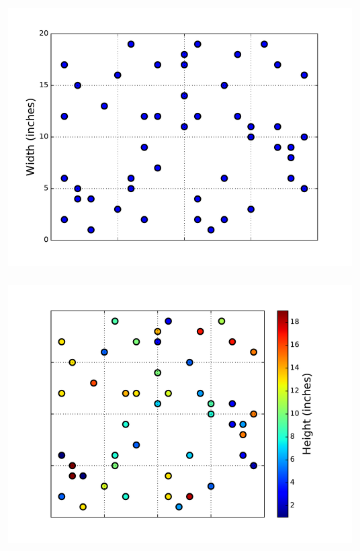 \begin{figure}[H] %
\centering
\begin{subfigure}{.495\textwidth}
    \centering
    \includegraphics[width=\linewidth]{figures/scatter_1.pdf}
\end{subfigure}
%
\begin{subfigure}{.495\textwidth}
    \centering
    \includegraphics[width=\linewidth]{figures/scatter_2.pdf}
\end{subfigure}
\\
\begin{subfigure}{.495\textwidth}
    \centering

\end{subfigure}
\end{figure}
